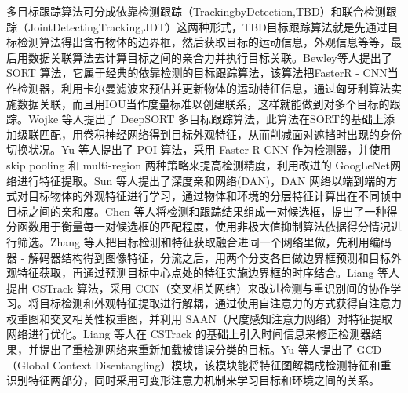 多目标跟踪算法可分成依靠检测跟踪（TrackingbyDetection,TBD）和联合检测跟踪（JointDetectingTracking,JDT）这两种形式，TBD目标跟踪算法就是先通过目标检测算法得出含有物体的边界框，然后获取目标的运动信息，外观信息等等，最后用数据关联算法去计算目标之间的亲合力并执行目标关联。Bewley等人\cite{bewley2016simple}提出了 SORT 算法，它属于经典的依靠检测的目标跟踪算法，该算法把FasterR - CNN当作检测器，利用卡尔曼滤波来预估并更新物体的运动特征信息，通过匈牙利算法实施数据关联，而且用IOU当作度量标准以创建联系，这样就能做到对多个目标的跟踪。Wojke 等人\cite{wojke2017simple}提出了 DeepSORT 多目标跟踪算法，此算法在SORT的基础上添加级联匹配，用卷积神经网络得到目标外观特征，从而削减面对遮挡时出现的身份切换状况。Yu 等人\cite{yu2016poi}提出了 POI 算法，采用 Faster R-CNN 作为检测器，并使用 skip pooling 和 multi-region 两种策略来提高检测精度，利用改进的 GoogLeNet\cite{szegedy2015going}网络进行特征提取。Sun 等人\cite{sun2019deep}提出了深度亲和网络(DAN)，DAN 网络以端到端的方式对目标物体的外观特征进行学习，通过物体和环境的分层特征计算出在不同帧中目标之间的亲和度。Chen 等人\cite{chen2018real}将检测和跟踪结果组成一对候选框，提出了一种得分函数用于衡量每一对候选框的匹配程度，使用非极大值抑制算法依据得分情况进行筛选。Zhang 等人\cite{zhang2021fairmot}把目标检测和特征获取融合进同一个网络里做，先利用编码器 - 解码器结构得到图像特征，分流之后，用两个分支各自做边界框预测和目标外观特征获取，再通过预测目标中心点处的特征实施边界框的时序结合。Liang 等人\cite{liang2022rethinking}提出 CSTrack 算法，采用 CCN（交叉相关网络）来改进检测与重识别间的协作学习。将目标检测和外观特征提取进行解耦，通过使用自注意力的方式获得自注意力权重图和交叉相关性权重图，并利用 SAAN\cite{zhao2020saan}（尺度感知注意力网络）对特征提取网络进行优化。Liang 等人\cite{liang2022fake}在 CSTrack 的基础上引入时间信息来修正检测器结果，并提出了重检测网络来重新加载被错误分类的目标。Yu 等人\cite{yu2022relationtrack}提出了 GCD（Global Context Disentangling）模块，该模块能将特征图解耦成检测特征和重识别特征两部分，同时采用可变形注意力机制来学习目标和环境之间的关系。

